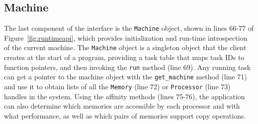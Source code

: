 




\subsection{Machine}
\label{subsec:machmodel}
The last component of the interface is the {\tt Machine} object, shown in lines 66-77 of Figure~\ref{fig:runtimeapi},
which provides initialization and run-time introspection
of the current machine.
The {\tt Machine} object is a singleton object that the client creates at the start of a
program, providing a task table that maps task IDs to function pointers,
and then invoking the {\tt run} method (line 69).
Any running task can get a pointer to the machine object with the
{\tt get\_machine} method (line 71) and use it to obtain lists of all the {\tt Memory} (line 72) or 
{\tt Processor} (line 73) handles in the system.  Using the affinity methods (lines 75-76),
the application can also determine which memories are accessible by each
processor and with what performance, as well as which pairs of memories support copy operations.

